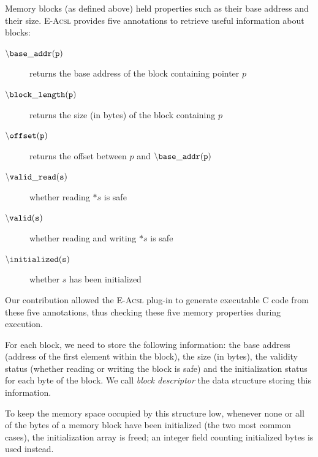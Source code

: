 \documentclass[a4paper,11pt]{article}
\begin{document}
Memory blocks (as defined above) held properties such as their base address and
their size. \textsc{E-Acsl} provides five annotations to retrieve useful
information about blocks:

\begin{description}
\item[${\tt \backslash base\_addr(p)}$]
  returns the base address of the block containing pointer $p$
\item[${\tt \backslash block\_length(p)}$]
  returns the size (in bytes) of the block containing $p$
\item[${\tt \backslash offset(p)}$]
  returns the offset between $p$ and ${\tt \backslash base\_addr(p)}$
\item[${\tt \backslash valid\_read(s)}$]
  whether reading $*s$ is safe
\item[${\tt \backslash valid(s)}$]
  whether reading and writing $*s$ is safe
\item[${\tt \backslash initialized(s)}$]
  whether $s$ has been initialized
\end{description}

Our contribution allowed the \textsc{E-Acsl} plug-in to generate executable C
code from these five annotations, thus checking these five memory properties
during execution.

For each block, we need to store the following information: the base address
(address of the first element within the block), the size (in bytes), the
validity status (whether reading or writing the block is safe) and the
initialization status for each byte of the block. We call {\em block descriptor}
the data structure storing this information.




To keep the memory space occupied by this structure low, whenever none or all of
the bytes of a memory block have been initialized (the two most common cases),
the initialization array is freed; an integer field counting initialized bytes
is used instead. 
\end{document}
